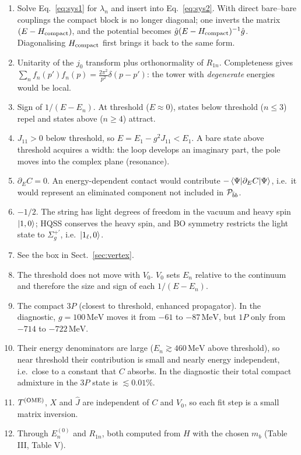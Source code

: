 \documentclass[11pt,a4paper]{article}
\newcommand{\TOME}{T^{\rm (OME)}}
\newcommand{\Pbb}{{\cal P}_{\bar bb}}
\newcommand{\MeV}{\,\mathrm{MeV}}
\begin{document}
\begin{enumerate}
\item Solve Eq.~\eqref{eq:sys1} for $\lambda_n$ and insert into Eq.~\eqref{eq:sys2}. With direct bare--bare couplings the compact block is no longer diagonal; one inverts the matrix $(E-H_{\rm compact})$, and the potential becomes $\hat g(E-H_{\rm compact})^{-1}\hat g$. Diagonalising $H_{\rm compact}$ first brings it back to the same form.
\item Unitarity of the $j_0$ transform plus orthonormality of $R_{1n}$. Completeness gives $\sum_nf_n(p')f_n(p)=\frac{2\pi^2}{p^2}\delta(p-p')$: the tower with \emph{degenerate} energies would be local.
\item Sign of $1/(E-E_n)$. At threshold ($E\approx0$), states below threshold ($n\le3$) repel and states above ($n\ge4$) attract.
\item $J_{11}>0$ below threshold, so $E=E_1-g^2J_{11}<E_1$. A bare state above threshold acquires a width: the loop develops an imaginary part, the pole moves into the complex plane (resonance).
\item $\partial_EC=0$. An energy-dependent contact would contribute $-\braket{\Psi|\partial_EC|\Psi}$, i.e.\ it would represent an eliminated component not included in $\Pbb$.
\item $-1/2$. The string has light degrees of freedom in the vacuum and heavy spin $\ket{1,0}$; HQSS conserves the heavy spin, and BO symmetry restricts the light state to $\Sigma_g^{+\prime}$, i.e.\ $\ket{1_\ell,0}$.
\item See the box in Sect.~\ref{sec:vertex}.
\item The threshold does not move with $V_0$. $V_0$ sets $E_n$ relative to the continuum and therefore the size and sign of each $1/(E-E_n)$.
\item The compact $3P$ (closest to threshold, enhanced propagator). In the diagnostic, $g=100\MeV$ moves it from $-61$ to $-87\MeV$, but $1P$ only from $-714$ to $-722\MeV$.
\item Their energy denominators are large ($E_n\gtrsim460\MeV$ above threshold), so near threshold their contribution is small and nearly energy independent, i.e.\ close to a constant that $C$ absorbs. In the diagnostic their total compact admixture in the $3P$ state is $\lesssim0.01\%$.
\item $\TOME$, $X$ and $\hat J$ are independent of $C$ and $V_0$, so each fit step is a small matrix inversion.
\item Through $E_n^{(0)}$ and $R_{1n}$, both computed from $H$ with the chosen $m_b$ (Table III, Table V).

\end{enumerate}
\end{document}
